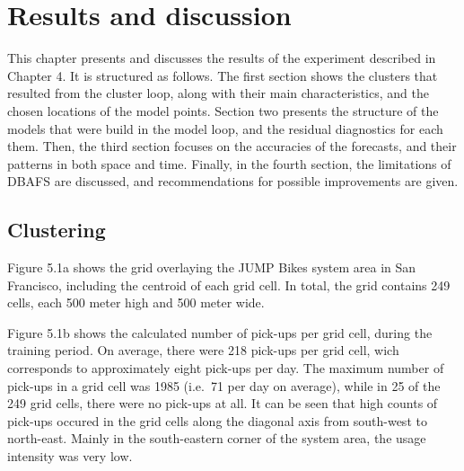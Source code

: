 \documentclass[12pt,oneside]{reedthesis}
\begin{document}
\chapter{Results and discussion}\label{results-and-discussion}

This chapter presents and discusses the results of the experiment
described in Chapter 4. It is structured as follows. The first section
shows the clusters that resulted from the cluster loop, along with their
main characteristics, and the chosen locations of the model points.
Section two presents the structure of the models that were build in the
model loop, and the residual diagnostics for each them. Then, the third
section focuses on the accuracies of the forecasts, and their patterns
in both space and time. Finally, in the fourth section, the limitations
of DBAFS are discussed, and recommendations for possible improvements
are given.

\section{Clustering}\label{clustering}

Figure 5.1a shows the grid overlaying the JUMP Bikes system area in San
Francisco, including the centroid of each grid cell. In total, the grid
contains 249 cells, each 500 meter high and 500 meter wide.

Figure 5.1b shows the calculated number of pick-ups per grid cell,
during the training period. On average, there were 218 pick-ups per grid
cell, wich corresponds to approximately eight pick-ups per day. The
maximum number of pick-ups in a grid cell was 1985 (i.e.~71 per day on
average), while in 25 of the 249 grid cells, there were no pick-ups at
all. It can be seen that high counts of pick-ups occured in the grid
cells along the diagonal axis from south-west to north-east. Mainly in
the south-eastern corner of the system area, the usage intensity was
very low.
\end{document}
